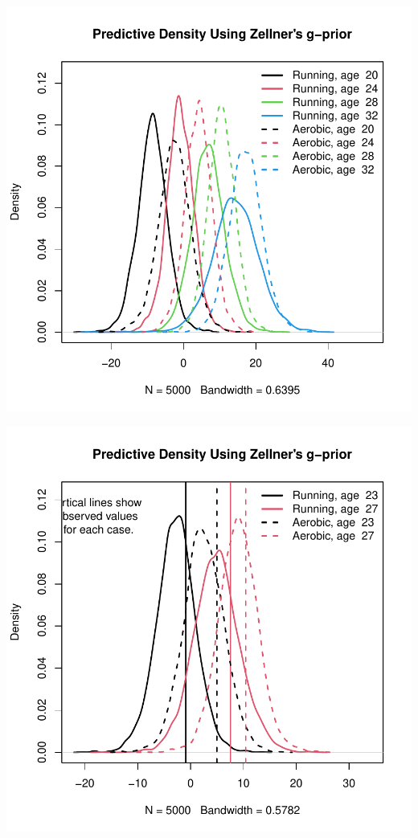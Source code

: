 \documentclass[12pt, a4paper]{article}
\begin{document}
\includegraphics{Thesis_v1-017}

\clearpage


\includegraphics{Thesis_v1-018}
\end{document}
